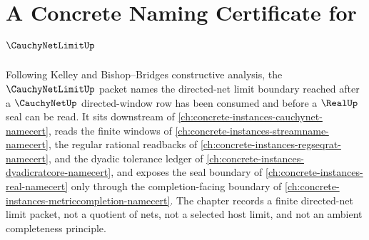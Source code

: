 \chapter{A Concrete Naming Certificate for $\CauchyNetLimitUp$}
\label{ch:concrete-instances-cauchynetlimit-namecert}

Following Kelley and Bishop--Bridges constructive analysis, the $\CauchyNetLimitUp$ packet names the directed-net limit boundary reached after a $\CauchyNetUp$ directed-window row has been consumed and before a $\RealUp$ seal can be read. It sits downstream of \autoref{ch:concrete-instances-cauchynet-namecert}, reads the finite windows of \autoref{ch:concrete-instances-streamname-namecert}, the regular rational readbacks of \autoref{ch:concrete-instances-regseqrat-namecert}, and the dyadic tolerance ledger of \autoref{ch:concrete-instances-dyadicratcore-namecert}, and exposes the seal boundary of \autoref{ch:concrete-instances-real-namecert} only through the completion-facing boundary of \autoref{ch:concrete-instances-metriccompletion-namecert}. The chapter records a finite directed-net limit packet, not a quotient of nets, not a selected host limit, and not an ambient completeness principle.

